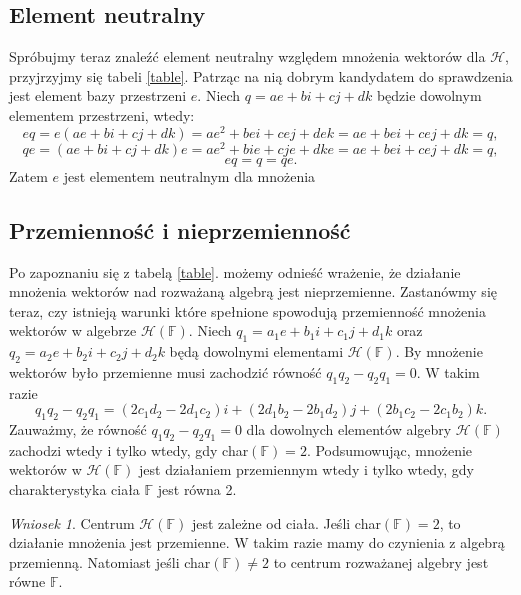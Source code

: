 \documentclass[a4paper,twoside,11pt,reqno]{mwrep}
\theoremstyle{plain} \newtheorem{twr}{Twierdzenie}
\theoremstyle{plain} \newtheorem{lem}{Lemat}
\theoremstyle{definition} \newtheorem{defi}{Definicja}
\theoremstyle{remark} \newtheorem*{wni}{Wniosek}
\theoremstyle{definition} \newtheorem{uwaga}{Uwaga}
\theoremstyle{definition}\newtheorem{prz}{Przykład}
\begin{document}
\subsection{Element neutralny}
Spróbujmy teraz znaleźć element neutralny względem mnożenia wektorów dla $\mathcal{H}$, przyjrzyjmy się tabeli \ref{table}. Patrząc na nią dobrym kandydatem do sprawdzenia jest element bazy przestrzeni $e$. Niech $q = a e +b i +cj +d k$ będzie dowolnym elementem przestrzeni, wtedy:
$$e q =e( a e +b i +cj +d k) =  a e^2 +b ei +cej +d ek = a e +b ei +cej +d k=q,$$
$$ qe =( a e +b i +cj +d k)e =  a e^2 +b ie +cje +d ke = a e +b ei +cej +d k=q,$$
$$eq=q=qe.$$
Zatem $e$ jest elementem neutralnym dla mnożenia 
\subsection{Przemienność i nieprzemienność}
Po zapoznaniu się z tabelą \ref{table}. możemy odnieść wrażenie, że działanie mnożenia 
wektorów nad rozważaną algebrą jest nieprzemienne.
Zastanówmy się teraz, czy istnieją warunki które spełnione spowodują przemienność mnożenia wektorów w algebrze 
$\mathcal{H}\left( \mathbb{F}\right)$. Niech 
$q_1=a_1e +b_1 i +c_1j +d_1 k$ oraz $q_2=a_2e +b_2 i +c_2j +d_2 k$ będą dowolnymi elementami 
$\mathcal{H}\left( \mathbb{F}\right)$. By mnożenie wektorów było przemienne musi zachodzić równość $q_1q_2 -q_2q_1 = 0$. W takim razie 
$$q_1q_2 -q_2q_1  = (2c_1d_2 -2d_1c_2)i+(2d_1b_2-2b_1d_2)j+(2b_1c_2-2c_1b_2)k.$$
Zauważmy, że równość $q_1q_2 -q_2q_1 = 0$ dla dowolnych elementów algebry
$\mathcal{H}\left( \mathbb{F}\right)$ zachodzi wtedy i tylko wtedy, gdy char$(\mathbb{F})=2.$
Podsumowując, mnożenie wektorów w $\mathcal{H}\left( \mathbb{F}\right)$ jest działaniem przemiennym wtedy i tylko wtedy, gdy charakterystyka ciała $\mathbb{F}$ jest równa 2.

\begin{wni}

Centrum $\mathcal{H}(\mathbb{F})$ jest zależne od ciała. Jeśli char$ \left( \mathbb{F}
\right) = 2 $, to działanie mnożenia jest przemienne. W takim razie mamy do 
czynienia z algebrą przemienną. Natomiast jeśli char$ \left( \mathbb{F}
\right)\neq 2$ to centrum rozważanej algebry jest równe $\mathbb{F}$. 
\end{wni}
\end{document}
